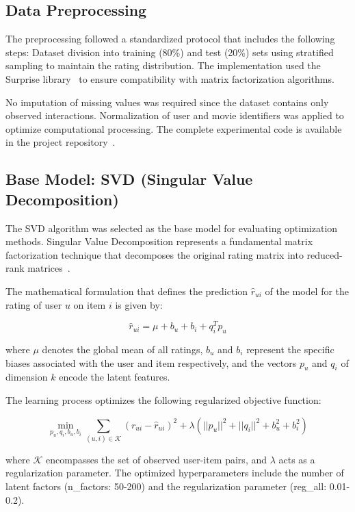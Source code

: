 \documentclass[conference]{IEEEtran}
\begin{document}
\subsection{Data Preprocessing}

The preprocessing followed a standardized protocol that includes the following steps: Dataset division into training (80\%) and test (20\%) sets using stratified sampling to maintain the rating distribution. The implementation used the Surprise library~\cite{hug2020surprise} to ensure compatibility with matrix factorization algorithms.

No imputation of missing values was required since the dataset contains only observed interactions. Normalization of user and movie identifiers was applied to optimize computational processing. The complete experimental code is available in the project repository~\cite{ccora2023bayesian}.

\subsection{Base Model: SVD (Singular Value Decomposition)}

The SVD algorithm was selected as the base model for evaluating optimization methods. Singular Value Decomposition represents a fundamental matrix factorization technique that decomposes the original rating matrix into reduced-rank matrices~\cite{bell2007lessons}.

The mathematical formulation that defines the prediction $\hat{r}_{ui}$ of the model for the rating of user $u$ on item $i$ is given by:

\begin{equation}
\hat{r}_{ui} = \mu + b_u + b_i + q_i^T p_u
\end{equation}

where $\mu$ denotes the global mean of all ratings, $b_u$ and $b_i$ represent the specific biases associated with the user and item respectively, and the vectors $p_u$ and $q_i$ of dimension $k$ encode the latent features.

The learning process optimizes the following regularized objective function:

\begin{equation}
\min_{p_u, q_i, b_u, b_i} \sum_{(u,i) \in \mathcal{K}} \left( r_{ui} - \hat{r}_{ui} \right)^2 + \lambda \left( ||p_u||^2 + ||q_i||^2 + b_u^2 + b_i^2 \right)
\end{equation}

where $\mathcal{K}$ encompasses the set of observed user-item pairs, and $\lambda$ acts as a regularization parameter. The optimized hyperparameters include the number of latent factors (n\_factors: 50-200) and the regularization parameter (reg\_all: 0.01-0.2).
\end{document}
